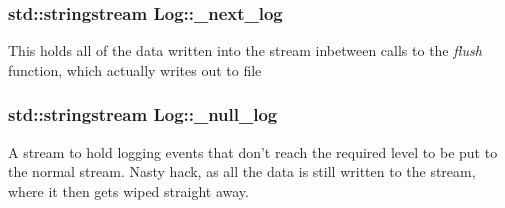 \subsubsection[{\-\_\-next\-\_\-log}]{\setlength{\rightskip}{0pt plus 5cm}std\-::stringstream Log\-::\-\_\-next\-\_\-log\hspace{0.3cm}{\ttfamily [private]}}\label{class_log_abdde24b4792aed62365ff7c2ef079085}
This holds all of the data written into the stream inbetween calls to the {\itshape flush} function, which actually writes out to file 
\subsubsection[{\-\_\-null\-\_\-log}]{\setlength{\rightskip}{0pt plus 5cm}std\-::stringstream Log\-::\-\_\-null\-\_\-log\hspace{0.3cm}{\ttfamily [private]}}\label{class_log_ab6a39fa59661a3d6bcd2fdaf69f6b74d}
A stream to hold logging events that don't reach the required level to be put to the normal stream. Nasty hack, as all the data is still written to the stream, where it then gets wiped straight away. 